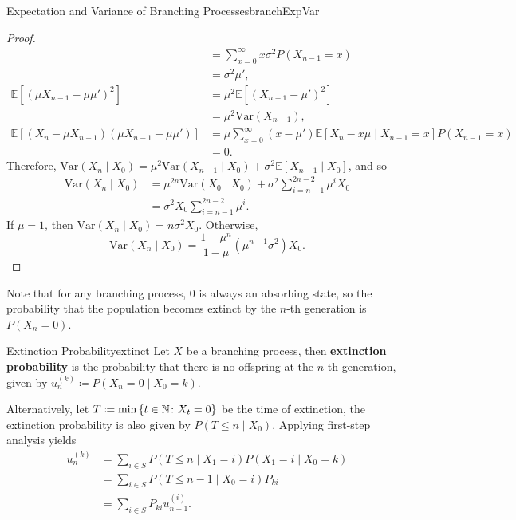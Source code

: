 \documentclass[math, code]{amznotes}
\theoremstyle{remark}
\begin{document}
\begin{probox}{Expectation and Variance of Branching Processes}{branchExpVar}
\begin{proof}
\begin{align*}
            & = \sum_{x = 0}^{\infty}x\sigma^2P\left(X_{n - 1} = x\right) \\
            & = \sigma^2\mu', \\
            \mathbb{E}\left[\left(\mu X_{n - 1} - \mu\mu'\right)^2\right] & = \mu^2\mathbb{E}\left[\left(X_{n - 1} - \mu'\right)^2\right] \\
            & = \mu^2\mathrm{Var}\left(X_{n - 1}\right), \\
            \mathbb{E}\left[\left(X_n - \mu X_{n - 1}\right)\left(\mu X_{n - 1} - \mu\mu'\right)\right] & = \mu\sum_{x = 0}^{\infty}\left(x - \mu'\right)\mathbb{E}\left[X_n - x\mu \mid X_{n - 1} = x\right]P\left(X_{n - 1} = x\right) \\
            & = 0.
        \end{align*}
        Therefore, $\mathrm{Var}\left(X_n \mid X_0\right) = \mu^2\mathrm{Var}\left(X_{n - 1} \mid X_0\right) + \sigma^2\mathbb{E}\left[X_{n - 1} \mid X_0\right]$, and so 
        \begin{align*}
            \mathrm{Var}\left(X_n \mid X_0\right) & = \mu^{2n}\mathrm{Var}\left(X_0 \mid X_0\right) + \sigma^2\sum_{i = n - 1}^{2n - 2}\mu^iX_0 \\
            & = \sigma^2X_0\sum_{i = n - 1}^{2n - 2}\mu^i.
        \end{align*}
        If $\mu = 1$, then $\mathrm{Var}\left(X_n \mid X_0\right) = n\sigma^2X_0$. Otherwise, 
        \begin{equation*}
            \mathrm{Var}\left(X_n \mid X_0\right) = \frac{1 - \mu^n}{1 - \mu}\left(\mu^{n - 1}\sigma^2\right)X_0.
        \end{equation*}
    \end{proof}
\end{probox}
Note that for any branching process, $0$ is always an absorbing state, so the probability that the population becomes extinct by the $n$-th generation is $P\left(X_n = 0\right)$.
\begin{dfnbox}{Extinction Probability}{extinct}
    Let $X$ be a branching process, then {\color{red} \textbf{extinction probability}} is the probability that there is no offspring at the $n$-th generation, given by $u_n^{(k)} \coloneqq P\left(X_n = 0 \mid X_0 = k\right)$.
\end{dfnbox}
Alternatively, let $T \coloneqq \min\left\{t \in \mathbb{N} \colon X_t = 0\right\}$ be the time of extinction, the extinction probability is also given by $P\left(T \leq n \mid X_0\right)$. Applying first-step analysis yields
\begin{align*}
    u_n^{(k)} & = \sum_{i \in S}P\left(T \leq n \mid X_1 = i\right)P\left(X_1 = i \mid X_0 = k\right) \\
    & = \sum_{i \in S}P\left(T \leq n - 1 \mid X_0 = i\right)P_{ki} \\
    & = \sum_{i \in S}P_{ki}u_{n - 1}^{(i)}.
\end{align*}
\end{document}
